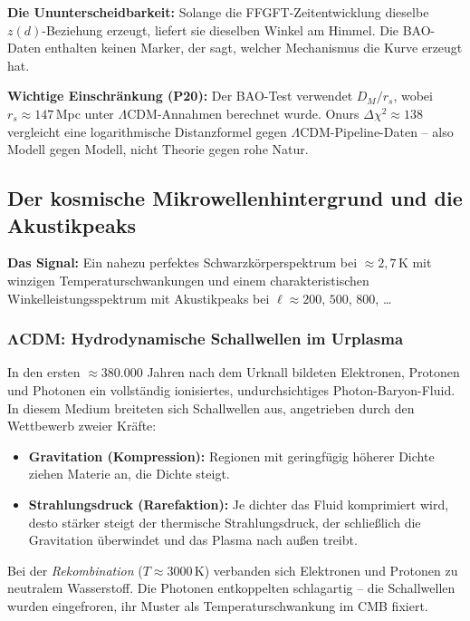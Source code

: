 \textbf{Die Ununterscheidbarkeit:} Solange die FFGFT-Zeitentwicklung
dieselbe $z(d)$-Beziehung erzeugt, liefert sie dieselben Winkel am Himmel.
Die BAO-Daten enthalten keinen Marker, der sagt, welcher Mechanismus die
Kurve erzeugt hat.

\textbf{Wichtige Einschränkung (P20):} Der BAO-Test verwendet $D_M/r_s$,
wobei $r_s \approx 147$\,Mpc unter $\Lambda$CDM-Annahmen berechnet wurde.
Onurs $\Delta\chi^2 \approx 138$ vergleicht eine logarithmische
Distanzformel gegen $\Lambda$CDM-Pipeline-Daten -- also Modell gegen Modell,
nicht Theorie gegen rohe Natur.

\subsection{Der kosmische Mikrowellenhintergrund und die Akustikpeaks}

\textbf{Das Signal:} Ein nahezu perfektes Schwarzkörperspektrum bei
$\approx 2{,}7$\,K mit winzigen Temperaturschwankungen und einem
charakteristischen Winkelleistungsspektrum mit Akustikpeaks bei
$\ell \approx 200$, $500$, $800$, \ldots

\subsubsection*{ΛCDM: Hydrodynamische Schallwellen im Urplasma}

In den ersten $\approx 380{.}000$ Jahren nach dem Urknall bildeten
Elektronen, Protonen und Photonen ein vollständig ionisiertes,
undurchsichtiges Photon-Baryon-Fluid. In diesem Medium breiteten sich
Schallwellen aus, angetrieben durch den Wettbewerb zweier Kräfte:

\begin{itemize}
  \item \textbf{Gravitation (Kompression):} Regionen mit geringfügig
        höherer Dichte ziehen Materie an, die Dichte steigt.
  \item \textbf{Strahlungsdruck (Rarefaktion):} Je dichter das Fluid
        komprimiert wird, desto stärker steigt der thermische
        Strahlungsdruck, der schließlich die Gravitation überwindet und
        das Plasma nach außen treibt.
\end{itemize}

Bei der \emph{Rekombination} ($T \approx 3000$\,K) verbanden sich
Elektronen und Protonen zu neutralem Wasserstoff. Die Photonen
entkoppelten schlagartig -- die Schallwellen wurden eingefroren, ihr
Muster als Temperaturschwankung im CMB fixiert.

